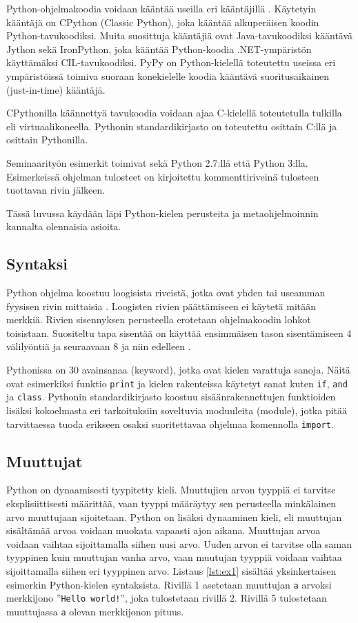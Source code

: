 \documentclass[finnish]{tktltiki2}
\theoremstyle{definition}
\theoremstyle{remark}
\begin{document}
Python-ohjelmakoodia voidaan kääntää useilla eri kääntäjillä \cite[s. 5]{martelli2006python}. Käytetyin kääntäjä on CPython (Classic Python), joka kääntää alkuperäisen koodin Python-tavukoodiksi. Muita suosittuja kääntäjiä ovat Java-tavukoodiksi kääntävä Jython sekä IronPython, joka kääntää Python-koodia .NET-ympäristön käyttämäksi CIL-tavukoodiksi. PyPy on Python-kielellä toteutettu useissa eri ympäristöissä toimiva suoraan konekielelle koodia kääntävä suoritusaikainen (just-in-time) kääntäjä. 

CPythonilla käännettyä tavukoodia voidaan ajaa C-kielellä toteutetulla tulkilla \cite[s. 22]{martelli2006python} eli virtuaalikoneella. Pythonin standardikirjasto on toteutettu osittain C:llä ja osittain Pythonilla.

Seminaarityön esimerkit toimivat sekä Python 2.7:llä että Python 3:lla. Esimerkeissä ohjelman tulosteet on kirjoitettu kommenttiriveinä tulosteen tuottavan rivin jälkeen.

Tässä luvussa käydään läpi Python-kielen perusteita ja metaohjelmoinnin kannalta olennaisia asioita.

\subsection{Syntaksi}

Python ohjelma koostuu loogisista riveistä, jotka ovat yhden tai useamman fyysisen rivin mittaisia \cite[s. 33]{martelli2006python}. Loogisten rivien päättämiseen ei käytetä mitään merkkiä. Rivien sisennyksen perusteella erotetaan ohjelmakoodin lohkot toisistaan. Suositeltu tapa sisentää on käyttää ensimmäisen tason sisentämiseen 4 välilyöntiä ja seuraavaan 8 ja niin edelleen \cite{pep8}. 

Pythonissa on 30 avainsanaa (keyword), jotka ovat kielen varattuja sanoja. Näitä ovat esimerkiksi funktio \verb|print| ja kielen rakenteissa käytetyt sanat kuten \verb|if|, \verb|and| ja \verb|class|. Pythonin standardikirjasto koostuu sisäänrakennettujen funktioiden lisäksi kokoelmasta eri tarkoituksiin soveltuvia moduuleita (module), jotka pitää tarvittaessa tuoda erikseen osaksi suoritettavaa ohjelmaa komennolla \verb|import|.

\subsection{Muuttujat}

Python on dynaamisesti tyypitetty kieli. Muuttujien arvon tyyppiä ei tarvitse eksplisiittisesti määrittää, vaan tyyppi määräytyy sen perusteella minkälainen arvo muuttujaan sijoitetaan. Python on lisäksi dynaaminen kieli, eli muuttujan sisältämää arvoa voidaan muokata vapaasti ajon aikana. Muuttujan arvoa voidaan vaihtaa sijoittamalla siihen uusi arvo. Uuden arvon ei tarvitse olla saman tyyppinen kuin muuttujan vanha arvo, vaan muutujan tyyppiä voidaan vaihtaa sijoittamalla siihen eri tyyppinen arvo. Listaus \ref{lst:ex1} sisältää yksinkertaisen esimerkin Python-kielen syntaksista. Rivillä 1 asetetaan muuttujan \verb|a| arvoksi merkkijono ''\verb|Hello world!|'', joka tulostetaan rivillä 2. Rivillä 5 tulostetaan muuttujassa \verb|a| olevan merkkijonon pituus.
\end{document}
